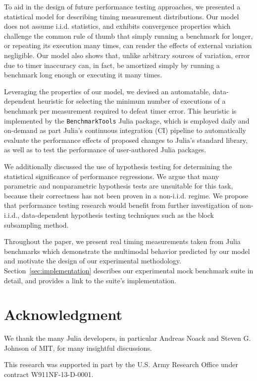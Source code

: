 \documentclass[conference]{IEEEtran}
\begin{document}
To aid in the design of future performance testing approaches, we presented a statistical
model for describing timing measurement distributions. Our model does not assume i.i.d.
statistics, and exhibits convergence properties which challenge the common rule of thumb
that simply running a benchmark for longer, or repeating its execution many times, can
render the effects of external variation negligible. Our model also shows that, unlike
arbitrary sources of variation, error due to timer inaccuracy can, in fact, be amortized
simply by running a benchmark long enough or executing it many times.

Leveraging the properties of our model, we devised an automatable, data-dependent heuristic
for selecting the minimum number of executions of a benchmark per measurement required to
defeat timer error. This heuristic is implemented by the \lstinline|BenchmarkTools| Julia
package, which is employed daily and on-demand as part Julia's continuous integration (CI)
pipeline to automatically evaluate the performance effects of proposed changes to Julia's
standard library, as well as to test the performance of user-authored Julia packages.

We additionally discussed the use of hypothesis testing for determining the statistical
significance of performance regressions. We argue that many parametric and nonparametric
hypothesis tests are unsuitable for this task, because their correctness has not been proven
in a non-i.i.d. regime. We propose that performance testing research would benefit from
further investigation of non-i.i.d., data-dependent hypothesis testing techniques such as
the block subsampling method.

Throughout the paper, we present real timing measurements taken from Julia benchmarks which
demonstrate the multimodal behavior predicted by our model and motivate the design of our
experimental methodology. Section~\ref{sec:implementation} describes our experimental mock
benchmark suite in detail, and provides a link to the suite's implementation.

\section*{Acknowledgment}
\label{sec:acknowledgement}

We thank the many Julia developers, in particular Andreas Noack and Steven G.
Johnson of MIT, for many insightful discussions.

This research was supported in part by the U.S. Army Research Office under
contract W911NF-13-D-0001.




\end{document}
